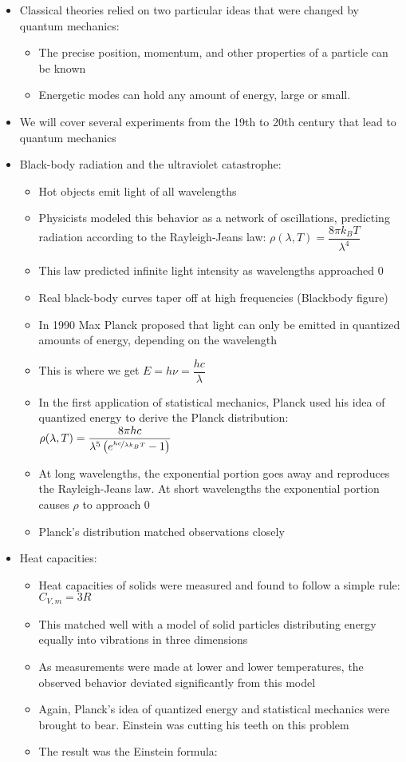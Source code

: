 \documentclass[12pt, openany, letterpaper]{memoir}
\begin{document}
\begin{itemize}
	\item Classical theories relied on two particular ideas that were changed by quantum mechanics:
	\begin{itemize}
		\item The precise position, momentum, and other properties of a particle can be known
		\item Energetic modes can hold any amount of energy, large or small.
	\end{itemize}
	\item We will cover several experiments from the 19th to 20th century that lead to quantum mechanics
	\item Black-body radiation and the ultraviolet catastrophe:
	\begin{itemize}
		\item Hot objects emit light of all wavelengths
		\item Physicists modeled this behavior as a network of oscillations, predicting radiation according to the Rayleigh-Jeans law: $\rho(\lambda,T)=\dfrac{8\pi k_BT}{\lambda^4}$
		\item This law predicted infinite light intensity as wavelengths approached 0
		\item Real black-body curves taper off at high frequencies (Blackbody figure)
		\item In 1990 Max Planck proposed that light can only be emitted in quantized amounts of energy, depending on the wavelength
		\item This is where we get $E=h\nu=\dfrac{hc}{\lambda}$
		\item In the first application of statistical mechanics, Planck used his idea of quantized energy to derive the Planck distribution: $\rho(\lambda, T)=\dfrac{8\pi hc}{\lambda^5\left(e^{\nicefrac{hc}{\lambda k_BT}}-1\right)}$
		\item At long wavelengths, the exponential portion goes away and reproduces the Rayleigh-Jeans law. At short wavelengths the exponential portion causes $\rho$ to approach 0
		\item Planck's distribution matched observations closely		
	\end{itemize}
	\item Heat capacities:
	\begin{itemize}
		\item Heat capacities of solids were measured and found to follow a simple rule: $C_{V,m} = 3R$
		\item This matched well with a model of solid particles distributing energy equally into vibrations in three dimensions
		\item As measurements were made at lower and lower temperatures, the observed behavior deviated significantly from this model
		\item Again, Planck's idea of quantized energy and statistical mechanics were brought to bear. Einstein was cutting his teeth on this problem
		\item The result was the Einstein formula:
		

\end{itemize}
\end{itemize}
\end{document}
